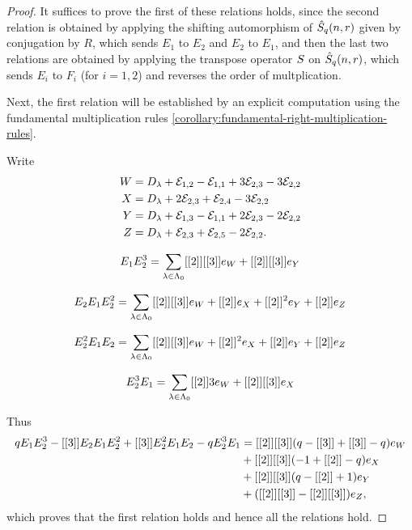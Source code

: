 \documentclass[a4paper, 11pt]{report}
\begin{document}
\begin{proof}
It suffices to prove the first of these relations holds, since the second relation is obtained by applying the shifting automorphism of $\hat{S}_q(n,r)$ given by conjugation by $R$, which sends $E_1$ to $E_2$ and $E_2$ to $E_1$, and then the last two relations are obtained by applying the transpose operator $S{}$ on $\hat{S}_q(n,r)$, which sends $E_i$ to $F_i$ (for $i=1,2$) and reverses the order of multplication.

Next, the first relation will be established by an explicit computation using the fundamental multiplication rules \ref{corollary:fundamental-right-multiplication-rules}.

Write
\begin{align*}
W &= D_{\lambda} +\mathcal{E}_{1,2} -\mathcal{E}_{1,1} +3\mathcal{E}_{2,3} -3\mathcal{E}_{2,2}\\
X &= D_{\lambda} +2\mathcal{E}_{2,3} +\mathcal{E}_{2,4} -3\mathcal{E}_{2,2}\\
Y &= D_{\lambda} +\mathcal{E}_{1,3} -\mathcal{E}_{1,1} +2\mathcal{E}_{2,3} -2\mathcal{E}_{2,2}\\
Z &= D_{\lambda} +\mathcal{E}_{2,3} +\mathcal{E}_{2,5} -2\mathcal{E}_{2,2}.
\end{align*}

\begin{equation*}
E_1 E_2^3 = \sum_{\lambda\in\Lambda_0{}} [[2]][[3]]e_W +[[2]][[3]]e_Y
\end{equation*}

\begin{equation*}
E_2 E_1 E_2^2 = \sum_{\lambda\in\Lambda_0{}} [[2]][[3]]e_W +[[2]]e_X +[[2]]^2e_Y + [[2]]e_Z
\end{equation*}

\begin{equation*}
E_2^2 E_1 E_2 = \sum_{\lambda\in\Lambda_0{}} [[2]][[3]]e_W +[[2]]^2e_X +[[2]]e_Y +[[2]]e_Z
\end{equation*}

\begin{equation*}
E_2^3 E_1 = \sum_{\lambda\in\Lambda_0{}} [[2]]{3}e_W +[[2]][[3]]e_X
\end{equation*}

Thus
\begin{align*}
qE_1 E_2^3 -[[3]]E_2E_1E_2^2 + [[3]]E_2^2E_1E_2 -qE_2^3E_1
&= [[2]][[3]](q -[[3]] +[[3]] -q)e_W\\
&+ [[2]][[3]](-1 +[[2]] -q)e_X\\
&+ [[2]][[3]](q -[[2]] +1)e_Y\\
&+ ([[2]][[3]]-[[2]][[3]])e_Z,
\end{align*}
which proves that the first relation holds and hence all the relations hold.
\end{proof}
\end{document}
